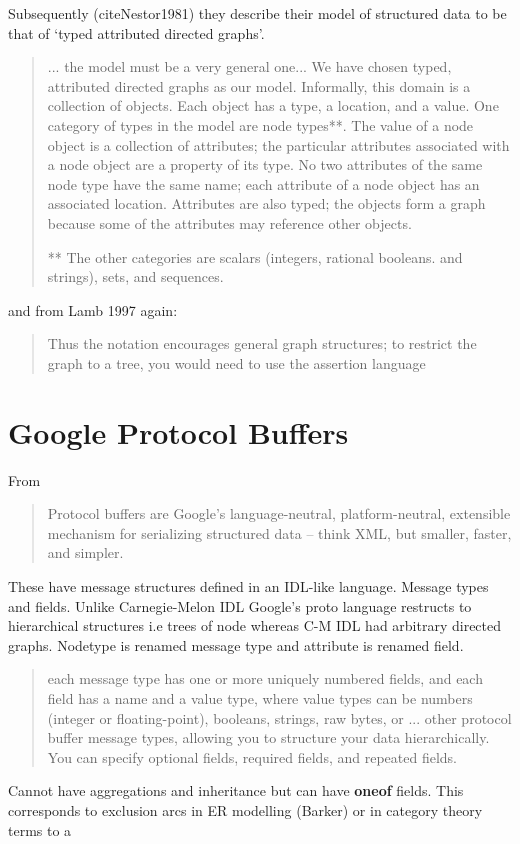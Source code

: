 \documentclass[10pt,a4paper]{scrartcl}
\begin{document}
Subsequently (cite{Nestor1981}) they describe their model of structured data to be that of `typed attributed directed graphs'. 

\begin{quote}
... the
model must be a very general one... We have
chosen typed, attributed directed graphs as our model. Informally, this domain is a collection of objects.
Each object has a type, a location, and a value. One category of types in the model are node types**. The value
of a node object is a collection of attributes; the particular attributes associated with a node object are a
property of its type. No two attributes of the same node type have the same name; each attribute of a node
object has an associated location. Attributes are also typed; the objects form a graph because some of the
attributes may reference other objects.

** The other categories are scalars (integers, rational booleans. and strings), sets, and sequences.
\end{quote}

and from Lamb 1997 again:
\begin{quote}
Thus the notation encourages general graph structures; to restrict the graph to a tree, you
would need to use the assertion language
\end{quote}

\section{Google Protocol Buffers}
From 
\begin{quote}
Protocol buffers are Google's language-neutral, platform-neutral, extensible mechanism for serializing structured data – think XML, but smaller, faster, and simpler. 
\end{quote}

These have message structures defined in an IDL-like language. Message types and fields. Unlike Carnegie-Melon IDL Google's proto language restructs to
hierarchical structures i.e trees of node whereas C-M IDL had arbitrary directed graphs. Nodetype is renamed message type and attribute is renamed field.

\begin{quote}
each message type has one or more uniquely numbered fields, and each field has a name and a value type, where value types can be numbers (integer or floating-point), booleans, strings, raw bytes, or ... other protocol buffer message types, allowing you to structure your data hierarchically. You can specify optional fields, required fields, and repeated fields.
\end{quote}
Cannot have aggregations and inheritance but can have \textbf{oneof} fields. This corresponds to exclusion arcs in ER modelling (Barker) or in category theory terms to a 
\end{document}
